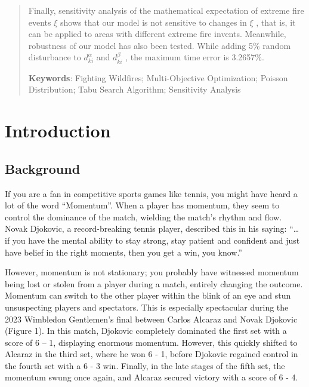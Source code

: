 \documentclass[12pt]{article}  %
\begin{document}
\begin{abstract}
Finally, sensitivity analysis of the mathematical expectation of extreme fire events $\xi$ shows that our model is not sensitive to changes in $\xi$ , that is, it can be applied to areas with different extreme fire invents. Meanwhile, robustness of our model has also been tested. While adding 5\% random disturbance to $d_{k i}^{\alpha}$  and $d_{k i}^{\beta}$ , the maximum time error is 3.2657\%. 

\vspace{5pt}  %
\textbf{Keywords}: Fighting Wildfires; Multi-Objective Optimization; Poisson Distribution; Tabu Search Algorithm; Sensitivity Analysis

\end{abstract}

\maketitle  %



\tableofcontents  




\section{Introduction}

\subsection{Background}
If you are a fan in competitive sports games like tennis, you might have heard a lot of the word “Momentum”. When a player has momentum, they seem to control the dominance of the match, wielding the match's rhythm and flow. Novak Djokovic, a record-breaking tennis player, described this in his saying: “… if you have the mental ability to stay strong, stay patient and confident and just have belief in the right moments, then you get a win, you know.”

However, momentum is not stationary; you probably have witnessed momentum being lost or stolen from a player during a match, entirely changing the outcome. Momentum can switch to the other player within the blink of an eye and stun unsuspecting players and spectators. This is especially spectacular during the 2023 Wimbledon Gentlemen’s final between Carlos Alcaraz and Novak Djokovic (Figure 1). In this match, Djokovic completely dominated the first set with a score of 6 – 1, displaying enormous momentum. However, this quickly shifted to Alcaraz in the third set, where he won 6 - 1, before Djokovic regained control in the fourth set with a 6 - 3 win. Finally, in the late stages of the fifth set, the momentum swung once again, and Alcaraz secured victory with a score of 6 - 4.
\end{document}
